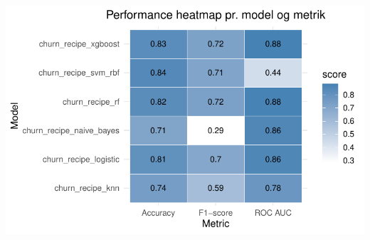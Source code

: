 \documentclass[
  11pt,
  letterpaper,
  DIV=11,
  numbers=noendperiod]{scrartcl}
\begin{document}
\includegraphics{Quarto_files/figure-pdf/unnamed-chunk-12-3.pdf}
\end{document}
